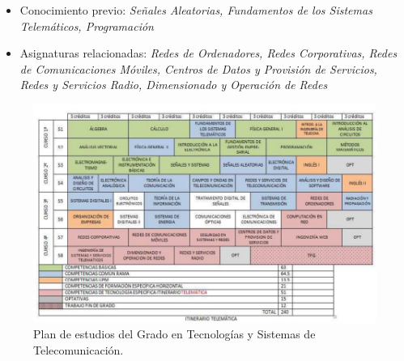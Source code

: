 \documentclass[xcolor=table,xcolor=x11names]{beamer}
\begin{document}
\begin{frame}{\subsecname}

\begin{itemize}
    \item Conocimiento previo:
        {\emph{Señales Aleatorias,
        Fundamentos de los Sistemas Telemáticos,
        Programación}}
    \item Asignaturas relacionadas:
        \tiny\emph{Redes de Ordenadores, Redes Corporativas,
        Redes de Comunicaciones Móviles,
        Centros de Datos y Provisión de Servicios,
        Redes y Servicios Radio, Dimensionado y Operación
        de Redes}
\end{itemize}

\begin{figure}[t]
    \centering
    \includegraphics[width=.6\textwidth]{figures/rstc-plan-estudios}
    \caption{Plan de estudios del Grado en Tecnologías
    y Sistemas de Telecomunicación.}
    \label{fig:gib-plan-estudios}
\end{figure}

\end{frame}
\end{document}
